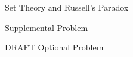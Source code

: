 \documentclass[handout]{mcs}
\begin{document}

\begin{staffnotes}
Set Theory and Russell's Paradox
\end{staffnotes}





\begin{center}
Supplemental Problem
\end{center}


\begin{center}
DRAFT Optional Problem
\end{center}



\end{document}
